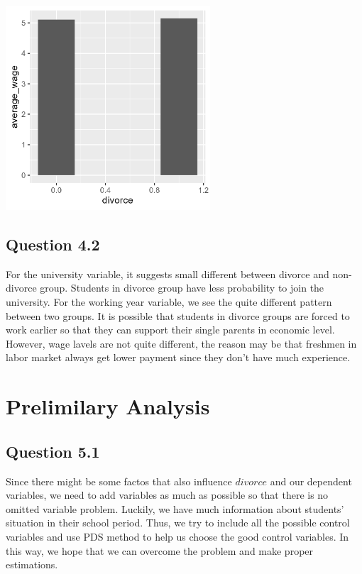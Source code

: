 \documentclass[11pt, letterpaper]{article}
\begin{document}
\begin{center}    
    \includegraphics[height=3in]{wagelevel_graph.png}
\end{center}

\subsection*{Question 4.2}

For the university variable, it suggests small different between divorce and non-divorce group. Students in divorce group have less probability to join the university.
For the working year variable, we see the quite different pattern between two groups. It is possible that students in divorce groups are forced to work earlier so that they can support their single parents in economic level.
However, wage lavels are not quite different, the reason may be that freshmen in labor market always get lower payment since they don't have much experience.

\section{Prelimilary Analysis}

\subsection*{Question 5.1}

Since there might be some factos that also influence $\textit{divorce}$ and our dependent variables, we need to add variables as much as possible so that there is no omitted variable problem.
Luckily, we have much information about students' situation in their school period. Thus, we try to include all the possible control variables and use PDS method to help us choose the good control variables.
In this way, we hope that we can overcome the problem and make proper estimations.
\end{document}
